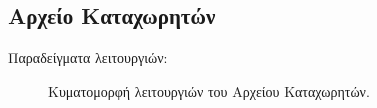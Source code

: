 \documentclass[11pt]{extarticle}
\begin{document}
\subsection{Αρχείο Καταχωρητών}
Παραδείγματα λειτουργιών:
\begin{figure}[H]
\centering
\renewcommand{\figurename}{Κυματομορφή} 
\caption[Κυματομορφή - Αρχείο Καταχωρητών]{Κυματομορφή λειτουργιών του Αρχείου Καταχωρητών.}
\end{figure}
\end{document}
